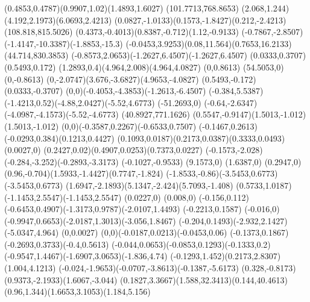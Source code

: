 {    \rcurveto(0.4853,0.4787)(0.9907,1.02)(1.4893,1.6027)
    \moveto(101.7713,768.8653)
    \rcurveto(2.068,1.244)(4.192,2.1973)(6.0693,2.4213)
    \rcurveto(0.0827,-1.0133)(0.1573,-1.8427)(0.212,-2.4213)
    \closepath
    \moveto(108.818,815.5026)
    \rcurveto(0.4373,-0.4013)(0.8387,-0.712)(1.12,-0.9133)
    \rcurveto(-0.7867,-2.8507)(-1.4147,-10.3387)(-1.8853,-15.3)
    \rcurveto(-0.0453,3.9253)(0.08,11.564)(0.7653,16.2133)
    \moveto(44.714,830.3853)
    \rcurveto(-0.8573,2.0653)(-1.2627,6.4507)(-1.2627,6.4507)
    \rlineto(0.0333,0.3707)
    \rlineto(0.5493,0.172)
    \rcurveto(1.2893,0.4)(4.964,2.008)(4.964,4.0827)
    \rlineto(0,0.8613)
    \rlineto(54.5053,0)
    \rlineto(0,-0.8613)
    \rcurveto(0,-2.0747)(3.676,-3.6827)(4.9653,-4.0827)
    \rlineto(0.5493,-0.172)
    \rlineto(0.0333,-0.3707)
    \rcurveto(0,0)(-0.4053,-4.3853)(-1.2613,-6.4507)
    \rlineto(-0.384,5.5387)
    \rcurveto(-1.4213,0.52)(-4.88,2.0427)(-5.52,4.6773)
    \rlineto(-51.2693,0)
    \rcurveto(-0.64,-2.6347)(-4.0987,-4.1573)(-5.52,-4.6773)
    \closepath
    \moveto(40.8927,771.1626)
    \rcurveto(0.5547,-0.9147)(1.5013,-1.012)(1.5013,-1.012)
    \rcurveto(0,0)(-0.3587,0.2267)(-0.6533,0.7507)
    \rcurveto(-0.1467,0.2613)(-0.0293,0.384)(0.1213,0.4427)
    \rcurveto(0.1093,0.0187)(0.2173,0.0387)(0.3333,0.0493)
    \rlineto(0.0027,0)
    \rcurveto(0.2427,0.02)(0.4907,0.0253)(0.7373,0.0227)
    \rcurveto(-0.1573,-2.028)(-0.284,-3.252)(-0.2893,-3.3173)
    \rlineto(-0.1027,-0.9533)
    \rlineto(9.1573,0)
    \rlineto(1.6387,0)
    \rlineto(0.2947,0)
    \rcurveto(0.96,-0.704)(1.5933,-1.4427)(0.7747,-1.824)
    \rcurveto(-1.8533,-0.86)(-3.5453,0.6773)(-3.5453,0.6773)
    \rcurveto(1.6947,-2.1893)(5.1347,-2.424)(5.7093,-1.408)
    \rcurveto(0.5733,1.0187)(-1.1453,2.5547)(-1.1453,2.5547)
    \rlineto(0.0227,0)
    \rlineto(0.008,0)
    \rlineto(-0.156,0.112)
    \rcurveto(-0.6453,0.4907)(-1.3173,0.9787)(-2.0107,1.4493)
    \rlineto(-0.2213,0.1587)
    \rlineto(-0.016,0)
    \rcurveto(-0.9947,0.6653)(-2.0187,1.3013)(-3.056,1.8467)
    \rcurveto(-0.204,0.1493)(-2.932,2.1427)(-5.0347,4.964)
    \rlineto(0,0.0027)
    \rcurveto(0,0)(-0.0187,0.0213)(-0.0453,0.06)
    \rcurveto(-0.1373,0.1867)(-0.2693,0.3733)(-0.4,0.5613)
    \rcurveto(-0.044,0.0653)(-0.0853,0.1293)(-0.1333,0.2)
    \rcurveto(-0.9547,1.4467)(-1.6907,3.0653)(-1.836,4.74)
    \rcurveto(-0.1293,1.452)(0.2173,2.8307)(1.004,4.1213)
    \rcurveto(-0.024,-1.9653)(-0.0707,-3.8613)(-0.1387,-5.6173)
    \rcurveto(0.328,-0.8173)(0.9373,-2.1933)(1.6067,-3.044)
    \rcurveto(0.1827,3.3667)(1.588,32.3413)(0.144,40.4613)
    \rcurveto(0.96,1.344)(1.6653,3.1053)(1.184,5.156)
}
